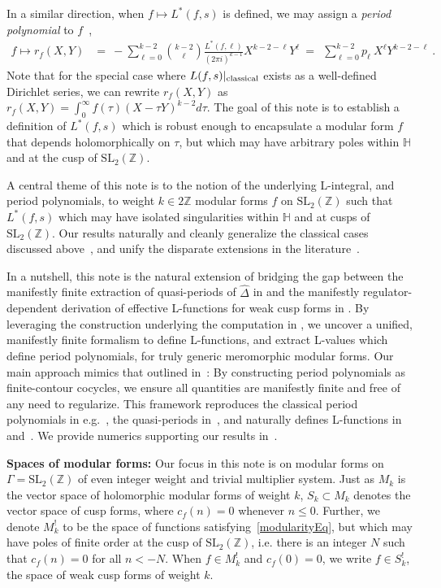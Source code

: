 \documentclass[11pt]{article}
\numberwithin{equation}{section}  %
\newcommand{\HH}{\mathbb{H}}
\newcommand{\ZZ}{\mathbb{Z}}
\newcommand{\SLZ}{\mathrm{SL}_2(\ZZ)}
\newcommand{\Dhat}{\widehat{\Delta}}
\begin{document}
In a similar direction, when $f \mapsto L^*(f, s)$ is defined, we may assign a 
\emph{period polynomial} to $f$~\cite{ZagierPeriods1991},
\begin{align}
\label{eqPeriodPoly}
f \mapsto r_f(X, Y) &=~ -\sum_{\ell=0}^{k-2} {k-2\choose \ell}\frac{L^*(f,\ell)}{(2\pi i)^{k-1}} X^{k-2-\ell} Y^{\ell} ~= ~~\sum_{\ell = 0}^{k-2} p_\ell~ X^\ell Y^{k-2-\ell}~.
\end{align}
Note that for the special case where $L(f,s)|_{\rm classical}$ exists as a well-defined 
Dirichlet series, we can rewrite $r_f(X, Y)$ as $r_f(X, Y) = \int_0^{\infty} f(\tau) (X - \tau Y)^{k-2} d\tau$. 
The goal of this note is to establish a definition of $L^*(f,s)$ which 
is robust enough to encapsulate a modular form $f$ that depends holomorphically 
on $\tau$, but which may have arbitrary poles within $\HH$ and at the cusp of $\SLZ$.

A central theme of this note is to the notion of the underlying L-integral, and period 
polynomials, to weight $k \in 2\ZZ$ modular forms $f$ on $\SLZ$ such that $L^*(f,s)$ 
which may have isolated singularities within $\HH$ and at cusps of $\SLZ$. Our results 
naturally and cleanly generalize the classical cases discussed above~\cite{01-Apostol}, 
and unify the disparate extensions in the literature~\cite{Brown2017, BFK2011, 1806}.  

In a nutshell, this note is the natural extension of bridging the gap between the 
manifestly finite extraction of quasi-periods of $\Dhat$ in \cite{Brown2017} and the 
manifestly regulator-dependent derivation of effective L-functions for weak cusp forms 
in \cite{BFK2011}. By leveraging the construction underlying the computation in \cite{Brown2017}, 
we uncover a unified, manifestly finite formalism to define L-functions, and extract L-values 
which define period polynomials, for truly generic meromorphic modular forms. 
Our main approach mimics that outlined in~\cite{Brown2017}: By constructing period 
polynomials as finite-contour cocycles, we ensure all quantities are manifestly finite and 
free of any need to regularize. This framework reproduces the classical period polynomials 
in e.g.~\cite{01-Apostol}, the quasi-periods in~\cite{Brown2017}, and naturally defines L-functions 
in~\cite{BFK2011} and~\cite{1806}. We provide numerics supporting our results in~\cite{VerifyScripts}.

{\bf Spaces of modular forms:}
Our focus in this note is on modular forms on $\Gamma = \SLZ$ of
even integer weight and trivial multiplier system. Just as $M_k$ is the
vector space of holomorphic modular forms of weight $k$, $S_k \subset M_k$ 
denotes the vector space of cusp forms, where $c_f(n) = 0$ whenever $n \leq 0$. 
Further, we denote $M^!_k$ to be the space of functions satisfying~\eqref{modularityEq}, 
but which may have poles of finite order at the cusp of $\SLZ$, i.e. there is an integer $N$ 
such that $c_f(n) = 0$ for all $n < -N$. When $f \in M_k^!$ and $c_f(0) = 0$, we write 
$f \in S_k^!$, the space of weak cusp forms of weight $k$. 
\end{document}
